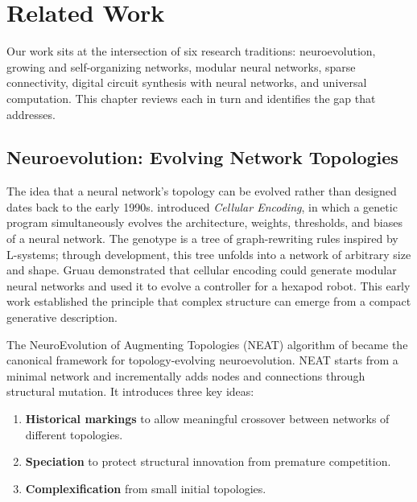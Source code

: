 
\chapter{Related Work}
\label{ch:related}

Our work sits at the intersection of six research traditions:
neuroevolution, growing and self-organizing networks, modular neural
networks, sparse connectivity, digital circuit synthesis with neural
networks, and universal computation. This chapter reviews each in turn
and identifies the gap that \modnet{} addresses.

\section{Neuroevolution: Evolving Network Topologies}
\label{sec:related-neuroevolution}

The idea that a neural network's topology can be evolved rather than
designed dates back to the early 1990s. \citet{gruau1994neural}
introduced \emph{Cellular Encoding}, in which a genetic program
simultaneously evolves the architecture, weights, thresholds, and biases
of a neural network. The genotype is a tree of graph-rewriting rules
inspired by L-systems; through development, this tree unfolds into a
network of arbitrary size and shape. Gruau demonstrated that cellular
encoding could generate modular neural networks and used it to evolve a
controller for a hexapod robot. This early work established the principle
that complex structure can emerge from a compact generative description.

The NeuroEvolution of Augmenting Topologies (NEAT) algorithm of
\citet{stanley2002evolving} became the canonical framework for
topology-evolving neuroevolution. NEAT starts from a minimal network and
incrementally adds nodes and connections through structural mutation. It
introduces three key ideas:

\begin{enumerate}
  \item \textbf{Historical markings} to allow meaningful crossover
    between networks of different topologies.
  \item \textbf{Speciation} to protect structural innovation from
    premature competition.
  \item \textbf{Complexification} from small initial topologies.
\end{enumerate}

